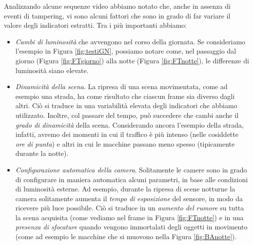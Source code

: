 Analizzando alcune sequenze video abbiamo notato che, anche in assenza di eventi di tampering, vi sono alcuni fattori che sono in grado di far variare il valore degli indicatori estratti.
Tra i pi\`u importanti abbiamo:
\begin{itemize}
	\item \textit{Cambi di luminosit\`a} che avvengono nel corso della giornata. 
	Se consideriamo l'esempio in Figura \ref{fig:testiGN}, possiamo notare come, nel passaggio dal giorno (Figura \ref{fig:FTgiorno}) alla notte (Figura \ref{fig:FTnotte}), le differenze di luminosit\`a siano elevate.  
	\item \textit{Dinamicit\`a della scena}. La ripresa di una scena movimentata, come ad esempio una strada, ha come risultato che ciascun frame sia diverso dagli altri.
	Ci\`o si traduce in una variabilit\`a elevata degli indicatori che abbiamo utilizzato. 
	Inoltre, col passare del tempo, pu\`o succedere che cambi anche il \textit{grado di dinamicit\`a} della scena.
	Considerando ancora l'esempio della strada, infatti, avremo dei momenti in cui il traffico \`e pi\`u intenso (nelle cosiddette \textit{ore di punta}) e altri in cui le macchine passano meno spesso (tipicamente durante la notte).
	\item \textit{Configurazione automatica della camera}. Solitamente le camere sono in grado di configurare in maniera automatica alcuni parametri, in base alle condizioni di luminosit\`a esterne.
	Ad esempio, durante la ripresa di scene notturne la camera solitamente aumenta il \textit{tempo di esposizione} del sensore, in modo da ricevere pi\`u luce possibile.
	Ci\`o si traduce in un \textit{aumento del rumore} su tutta la scena acquisita (come vediamo nel frame in Figura \ref{fig:FTnotte}) e in una \textit{presenza di sfocature} quando vengono immortalati degli oggetti in movimento (come ad esempio le macchine che si muovono nella Figura \ref{fig:BAnotte}).
\end{itemize} 
